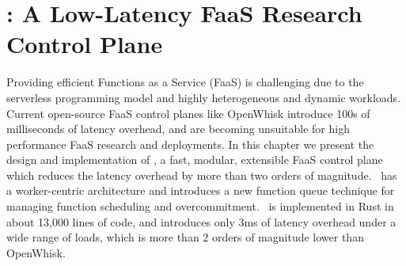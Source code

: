 \chapter{\sysname: A Low-Latency FaaS Research Control Plane}
\label{chap:iluvatar}

Providing efficient Functions as a Service (FaaS) is challenging due to the serverless programming model and highly heterogeneous and dynamic workloads. 
Current open-source FaaS control planes like OpenWhisk introduce 100s of milliseconds of latency overhead, and are becoming unsuitable for high performance FaaS research and deployments.
In this chapter we present the design and implementation of \sysname, a fast, modular, extensible FaaS control plane which reduces the latency overhead by more than two orders of magnitude.
\sysname~has a worker-centric architecture and introduces a new function queue technique for managing function scheduling and overcommitment. 
\sysname~is implemented in Rust in about 13,000 lines of code, and introduces only 3ms of latency overhead under a wide range of loads, which is more than 2 orders of magnitude lower than OpenWhisk. 













